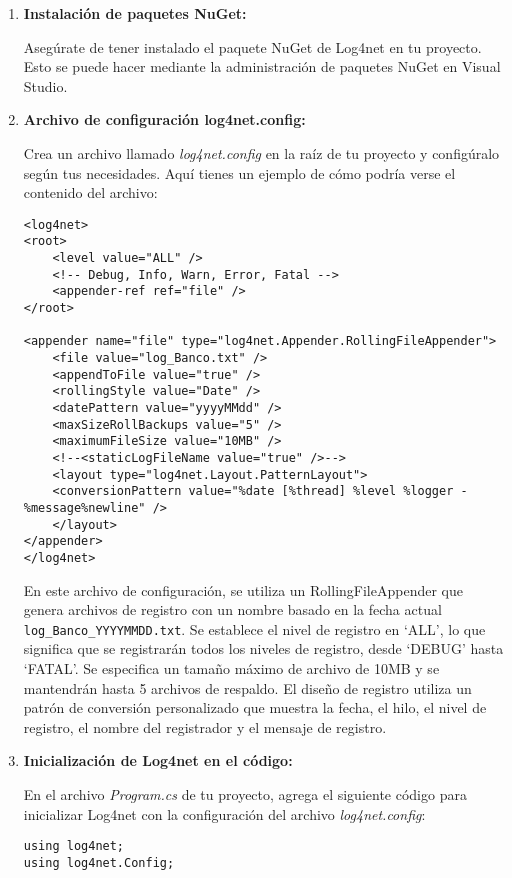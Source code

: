 \documentclass[executivepaper]{article}
\begin{document}
\begin{enumerate}
  \item \textbf{Instalación de paquetes NuGet:}
  
  Asegúrate de tener instalado el paquete NuGet de Log4net en tu proyecto. Esto se puede hacer mediante la administración de paquetes NuGet en Visual Studio.
  
  \item \textbf{Archivo de configuración log4net.config:}
  
  Crea un archivo llamado \emph{log4net.config} en la raíz de tu proyecto y configúralo según tus necesidades. Aquí tienes un ejemplo de cómo podría verse el contenido del archivo:
  
  \begin{lstlisting}
<log4net>
<root>
    <level value="ALL" />
    <!-- Debug, Info, Warn, Error, Fatal -->
    <appender-ref ref="file" />
</root>

<appender name="file" type="log4net.Appender.RollingFileAppender">
    <file value="log_Banco.txt" />
    <appendToFile value="true" />
    <rollingStyle value="Date" />
    <datePattern value="yyyyMMdd" />
    <maxSizeRollBackups value="5" />
    <maximumFileSize value="10MB" />
    <!--<staticLogFileName value="true" />-->
    <layout type="log4net.Layout.PatternLayout">
    <conversionPattern value="%date [%thread] %level %logger - %message%newline" />
    </layout>
</appender>
</log4net>
\end{lstlisting}
En este archivo de configuración, se utiliza un RollingFileAppender que genera archivos de registro con un nombre basado en la fecha actual \lstinline{log_Banco_YYYYMMDD.txt}. Se establece el nivel de registro en \enquote*{ALL}, lo que significa que se registrarán todos los niveles de registro, desde \enquote*{DEBUG} hasta \enquote*{FATAL}. Se especifica un tamaño máximo de archivo de 10MB y se mantendrán hasta 5 archivos de respaldo. El diseño de registro utiliza un patrón de conversión personalizado que muestra la fecha, el hilo, el nivel de registro, el nombre del registrador y el mensaje de registro.

\item \textbf{Inicialización de Log4net en el código:}
  
  En el archivo \emph{Program.cs} de tu proyecto, agrega el siguiente código para inicializar Log4net con la configuración del archivo \emph{log4net.config}:
  
\begin{lstlisting}
using log4net;
using log4net.Config;


\end{lstlisting}
\end{enumerate}
\end{document}

